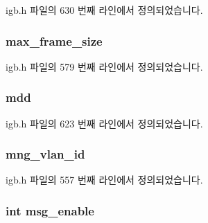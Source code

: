 igb.\+h 파일의 630 번째 라인에서 정의되었습니다.

\subsubsection[{\texorpdfstring{max\+\_\+frame\+\_\+size}{max_frame_size}}]{ max\+\_\+frame\+\_\+size}\hypertarget{structigb__adapter_ab2d6e66aa932631abea013f746ba81df}{}\label{structigb__adapter_ab2d6e66aa932631abea013f746ba81df}


igb.\+h 파일의 579 번째 라인에서 정의되었습니다.

\subsubsection[{\texorpdfstring{mdd}{mdd}}]{ mdd}\hypertarget{structigb__adapter_a0a2ce3d164da662fb8f57459c298a1f6}{}\label{structigb__adapter_a0a2ce3d164da662fb8f57459c298a1f6}


igb.\+h 파일의 623 번째 라인에서 정의되었습니다.

\subsubsection[{\texorpdfstring{mng\+\_\+vlan\+\_\+id}{mng_vlan_id}}]{ mng\+\_\+vlan\+\_\+id}\hypertarget{structigb__adapter_a4cc29a4612e6f7cbe2c49b41ad1637a3}{}\label{structigb__adapter_a4cc29a4612e6f7cbe2c49b41ad1637a3}


igb.\+h 파일의 557 번째 라인에서 정의되었습니다.

\subsubsection[{\texorpdfstring{msg\+\_\+enable}{msg_enable}}]{\setlength{\rightskip}{0pt plus 5cm}int msg\+\_\+enable}\hypertarget{structigb__adapter_aa31191614969a918cd81decb15c6b9dd}{}\label{structigb__adapter_aa31191614969a918cd81decb15c6b9dd}


